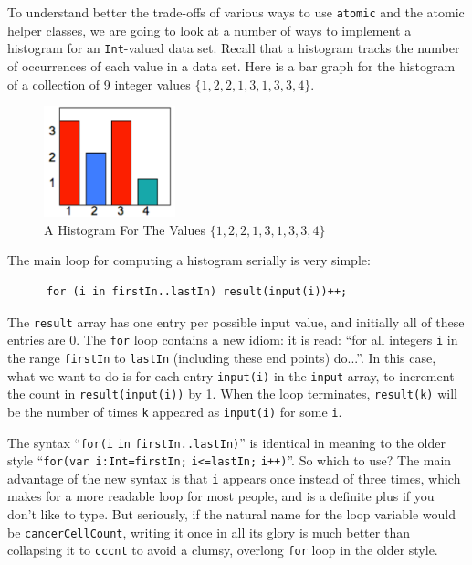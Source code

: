 To understand better the trade-offs of various ways to use {\tt atomic} and the
atomic helper classes, we are going to look at a number of ways to implement
a histogram for an {\tt Int}-valued data set.  Recall that a histogram tracks
the number of occurrences of each value in a data set.  Here is
a bar graph for the histogram of a collection of 9 integer values $\{1,2,2,1,3,1,3,3,4\}$.
\begin{figure}[!htbp]
\hrulefill
\begin{center} 
\includegraphics[width=1.5in]{"images/histogram"} 
\caption{A Histogram For The Values $\{1,2,2,1,3,1,3,3,4\}$}
\label{fig:histogram}
\end{center}
\hrulefill
\end{figure}

The main loop for computing a histogram serially is very simple:
\begin{verbatim}
      for (i in firstIn..lastIn) result(input(i))++; 
\end{verbatim}
The {\tt result} array has one entry per possible input value, and initially all
of these entries are 0.  The {\tt for} loop contains a new idiom: it is
read: ``for all integers {\tt i} in the range {\tt firstIn} to {\tt lastIn}
(including these end points) do...''.  In this case, what we want to do  is
for each entry {\tt input(i)} in the {\tt input} array, to increment the count in
 {\tt result(input(i))} by 1.  When the loop terminates, {\tt result(k)} will be
 the number of times {\tt k} appeared as {\tt input(i)} for some {\tt i}.
 
 \begin{finepoint}
 The syntax ``{\tt for(i} {\tt in} {\tt firstIn..lastIn)}''  is identical in meaning to the
 older style ``{\tt for(var i:Int=firstIn;} {\tt i<=lastIn;} {\tt i++)}''.  So which to use?
 The main advantage of the new syntax is that {\tt i} appears once instead
 of three times, which makes for a more readable loop for most people,
 and is a definite plus if you don't like to type.  But seriously, if the natural
 name for the loop variable would be {\tt cancerCellCount}, writing it once
 in all its glory is much better than collapsing it to {\tt cccnt} to avoid a
 clumsy, overlong {\tt for} loop in the older style.
 \end{finepoint}
 
